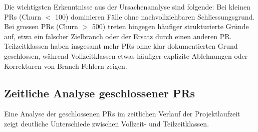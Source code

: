 Die wichtigsten Erkenntnisse aus der Ursachenanalyse sind folgende: Bei kleinen PRs (Churn $<$ 100) dominieren Fälle ohne nachvollziehbaren Schliessungsgrund. Bei grossen PRs (Churn $>$ 500) treten hingegen häufiger strukturierte Gründe auf, etwa ein falscher Zielbranch oder der Ersatz durch einen anderen PR. Teilzeitklassen haben insgesamt mehr PRs ohne klar dokumentierten Grund geschlossen, während Vollzeitklassen etwas häufiger explizite Ablehnungen oder Korrekturen von Branch-Fehlern zeigen.


\subsection{Zeitliche Analyse geschlossener PRs}

Eine Analyse der geschlossenen PRs im zeitlichen Verlauf der Projektlaufzeit zeigt deutliche Unterschiede zwischen Vollzeit- und Teilzeitklassen.

